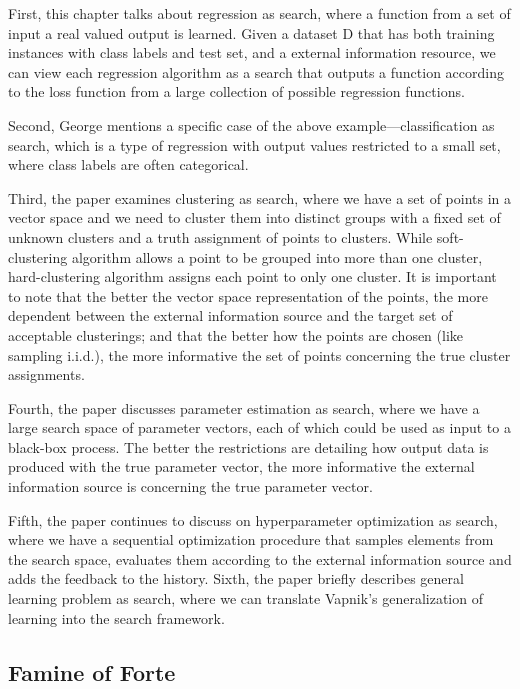 \documentclass[12pt]{article}
\begin{document}
	
	First, this chapter talks about regression as search, where a function from a set of input a real valued output is learned. Given a dataset D that has both training instances with class labels and test set, and a external information resource, we can view each regression algorithm as a search that outputs a function according to the loss function from a large collection of possible regression functions. 
	
	Second, George mentions a specific case of the above example—classification as search, which is a type of regression with output values restricted to a small set, where class labels are often categorical. 
	
	Third, the paper examines clustering as search, where we have a set of points in a vector space and we need to cluster them into distinct groups with a fixed set of unknown clusters and a truth assignment of points to clusters. While soft-clustering algorithm allows a point to be grouped into more than one cluster, hard-clustering algorithm assigns each point to only one cluster. It is important to note that the better the vector space representation of the points, the more dependent between the external information source and the target set of acceptable clusterings; and that the better how the points are chosen (like sampling i.i.d.), the more informative the set of points concerning the true cluster assignments.
	
	Fourth, the paper discusses parameter estimation as search, where we have a large search space of parameter vectors, each of which could be used as input to a black-box process. The better the restrictions are detailing how output data is produced with the true parameter vector, the more informative the external information source is concerning the true parameter vector.
	
	Fifth, the paper continues to discuss on hyperparameter optimization as search, where we have a sequential optimization procedure that samples elements from the search space, evaluates them according to the external information source and adds the feedback to the history. 
	Sixth, the paper briefly describes general learning problem as search, where we can translate Vapnik’s generalization of learning into the search framework.


\newpage


\subsection*{Famine of Forte} 
\end{document}

